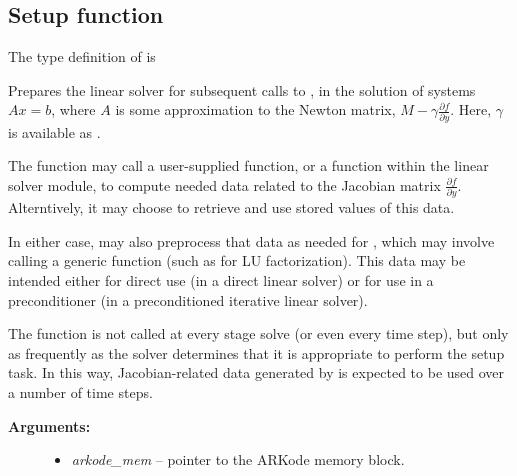 \documentclass[letterpaper,10pt,english]{sphinxmanual}
\begin{document}
\subsection{Setup function}
\label{linear_solvers/custom:setup-function}
The type definition of {\hyperref[linear_solvers/custom:lsetup]{}} is

\begin{fulllineitems}
\label{linear_solvers/custom:lsetup}
Prepares the linear solver for subsequent calls to
{\hyperref[linear_solvers/custom:lsolve]{}}, in the solution of systems $A x = b$,
where $A$ is some approximation to the Newton matrix,
$M-\gamma \frac{\partial f}{\partial y}$.  Here,
$\gamma$ is available as .

The {\hyperref[linear_solvers/custom:lsetup]{}} function may call a user-supplied function,
or a function within the linear solver module, to compute needed
data related to the Jacobian matrix $\frac{\partial
f}{\partial y}$.  Alterntively, it may choose to retrieve and use
stored values of this data.

In either case, {\hyperref[linear_solvers/custom:lsetup]{}} may also preprocess that data as
needed for {\hyperref[linear_solvers/custom:lsolve]{}}, which may involve calling a generic
function (such as for LU factorization).  This data may be intended
either for direct use (in a direct linear solver) or for use in a
preconditioner (in a preconditioned iterative linear solver).

The {\hyperref[linear_solvers/custom:lsetup]{}} function is not called at every stage solve
(or even every time step), but only as frequently as the solver
determines that it is appropriate to perform the setup task.  In
this way, Jacobian-related data generated by {\hyperref[linear_solvers/custom:lsetup]{}} is
expected to be used over a number of time steps.
\begin{description}
\item[{\textbf{Arguments:}}] \leavevmode\begin{itemize}
\item {} 
\emph{arkode\_mem} -- pointer to the ARKode memory block.


\end{itemize}
\end{description}
\end{fulllineitems}
\end{document}

